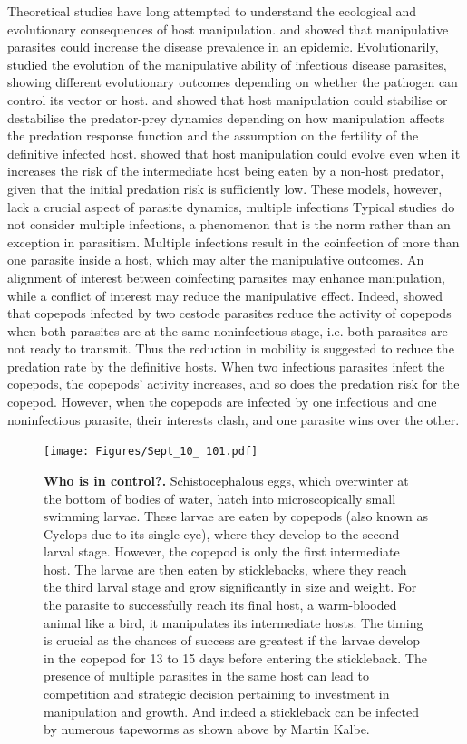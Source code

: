 \documentclass[11pt]{article}
\begin{document}
Theoretical studies have long attempted to understand the ecological and evolutionary consequences of host manipulation. 
\cite{Roosien2013} and \cite{Hosack2008} showed that manipulative parasites could increase the disease prevalence in an epidemic. Evolutionarily, \cite{Gandon2018} studied the evolution of the manipulative ability of infectious disease parasites, showing different evolutionary outcomes depending on whether the pathogen can control its vector or host.
\cite{Hadeler1989, Fenton2006} and \cite{Rogawa2018} showed that host manipulation could stabilise or destabilise the predator-prey dynamics depending on how manipulation affects the predation response function and the assumption on the fertility of the definitive infected host. \cite{Seppl2008} showed that host manipulation could evolve even when it increases the risk of the intermediate host being eaten by a non-host predator, given that the initial predation risk is sufficiently low. 
These models, however, lack a crucial aspect of parasite dynamics, multiple infections \citep{kalbe:JFB:2002} 
Typical studies do not consider multiple infections, a phenomenon that is the norm rather than an exception in parasitism. 
Multiple infections result in the coinfection of more than one parasite inside a host, which may alter the manipulative outcomes. 
An alignment of interest between coinfecting parasites may enhance manipulation, while a conflict of interest may reduce the manipulative effect. 
Indeed, \cite{Hafer:2015gl} showed that copepods infected by two cestode parasites reduce the activity of copepods when both parasites are at the same noninfectious stage, i.e. both parasites are not ready to transmit. 
Thus the reduction in mobility is suggested to reduce the predation rate by the definitive hosts. 
When two infectious parasites infect the copepods, the copepods' activity increases, and so does the predation risk for the copepod. 
However, when the copepods are infected by one infectious and one noninfectious parasite, their interests clash, and one parasite wins over the other. 

\begin{figure}[ht!]
\centering
\texttt{[image: Figures/Sept\_10\_ 101.pdf]}
\caption{\textbf{Who is in control?.}
Schistocephalous eggs, which overwinter at the bottom of bodies of water, hatch into microscopically small swimming larvae. 
These larvae are eaten by copepods (also known as Cyclops due to its single eye), where they develop to the second larval stage. 
However, the copepod is only the first intermediate host. 
The larvae are then eaten by sticklebacks, where they reach the third larval stage and grow significantly in size and weight. 
For the parasite to successfully reach its final host, a warm-blooded animal like a bird, it manipulates its intermediate hosts. 
The timing is crucial as the chances of success are greatest if the larvae develop in the copepod for 13 to 15 days before entering the stickleback. 
The presence of multiple parasites in the same host can lead to competition and strategic decision pertaining to investment in manipulation and growth.
And indeed a stickleback can be infected by numerous tapeworms as shown above by Martin Kalbe.
}
\label{fig:schematic}
\end{figure}
\end{document}

